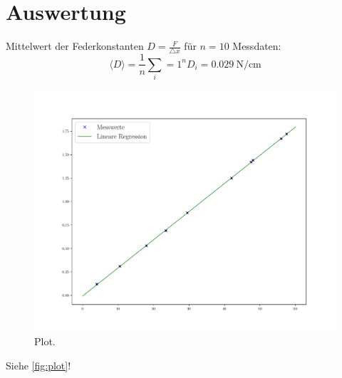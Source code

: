 \section{Auswertung}
\label{sec:Auswertung}
Mittelwert der Federkonstanten $D = \frac{F}{\triangle x}$ für $n = 10$ Messdaten: 
\begin{equation}
\langle D \rangle = \frac{1}{n} \sum_i=1^n D_i = \SI{0.029}{\newton\per\centi\meter}
\end{equation}

\begin{figure}
    \centering
    \includegraphics{Plot.pdf}
    \caption{Plot.}
    \label{fig:plot}
  \end{figure}
  
  
  Siehe \autoref{fig:plot}!